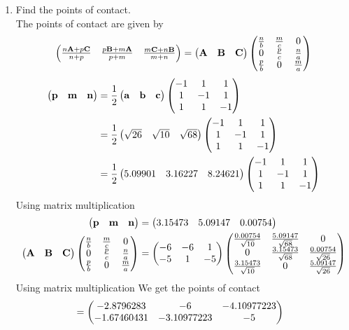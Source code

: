 \documentclass[11pt]{book}
\begin{document}
\begin{enumerate}[label=\thesubsection.\arabic*.,ref=\thesubsection.\theenumi]
\item Find the points of contact. \\ 
\solution The points of contact are given by 
\begin{align}
\begin{pmatrix}			\frac{n\mathbf{A}+p\mathbf{C}}{n+p}
&
\frac{p\mathbf{B}+m\mathbf{A}}{p+m}
&
\frac{m\mathbf{C}+n\mathbf{B}}{m+n}
\end{pmatrix}
= 	\begin{pmatrix}\mathbf{A} & \mathbf{B} &\mathbf{C}\end{pmatrix}\begin{pmatrix}\frac{n}{b} & \frac{m}{c} & 0\\0 & \frac{p}{c} & \frac{n}{a} \\\frac{p}{b} & 0 & \frac{m}{a}\end{pmatrix}
\end{align}
\begin{align}
    \begin{pmatrix}\mathbf{p} & \mathbf{m} & \mathbf{n} \end{pmatrix} &=\frac{1}{2} \begin{pmatrix}\mathbf{a} & \mathbf{b} & \mathbf{c}\end{pmatrix} \begin{pmatrix} -1 & 1 & 1 \\1 & -1 & 1 \\1 & 1 & -1 \end{pmatrix} \\
   &= \frac{1}{2}\begin{pmatrix} \sqrt{26}&  \sqrt{10} &\sqrt{68} \end{pmatrix}\begin{pmatrix} -1 & 1 & 1 \\1 & -1 & 1 \\1 & 1 & -1 \end{pmatrix}  \\
   &= \frac{1}{2}\begin{pmatrix} 5.09901&  3.16227 & 8.24621 \end{pmatrix}\begin{pmatrix} -1 & 1 & 1 \\1 & -1 & 1 \\1 & 1 & -1 \end{pmatrix}
\end{align}
Using matrix multiplication 
\begin{align}
        \begin{pmatrix}\mathbf{p} & \mathbf{m} & \mathbf{n} \end{pmatrix} &= \begin{pmatrix}  3.15473& 5.09147 & 0.00754 \end{pmatrix}   \\
\begin{pmatrix}\mathbf{A} & \mathbf{B} &\mathbf{C}\end{pmatrix}\begin{pmatrix}\frac{n}{b} & \frac{m}{c} & 0\\0 & \frac{p}{c} & \frac{n}{a} \\\frac{p}{b} & 0 & \frac{m}{a}\end{pmatrix} 
  &= \begin{pmatrix}-6 & -6 & 1 \\ -5 & 1 & -5\end{pmatrix} \begin{pmatrix}\frac{0.00754}{\sqrt{10}} & \frac{5.09147}{\sqrt{68}} & 0\\0 & \frac{3.15473}{\sqrt{68}} & \frac{0.00754}{\sqrt{26}} \\\frac{3.15473}{\sqrt{10}} & 0 & \frac{5.09147}{\sqrt{26}}\end{pmatrix}
\end{align}
Using matrix multiplication We get the points of contact 
\begin{align}
    &= \begin{pmatrix} -2.8796283 & -6 & -4.10977223\\ -1.67460431 & -3.10977223 & -5 \end{pmatrix}
\end{align}

\end{enumerate}
\end{document}
